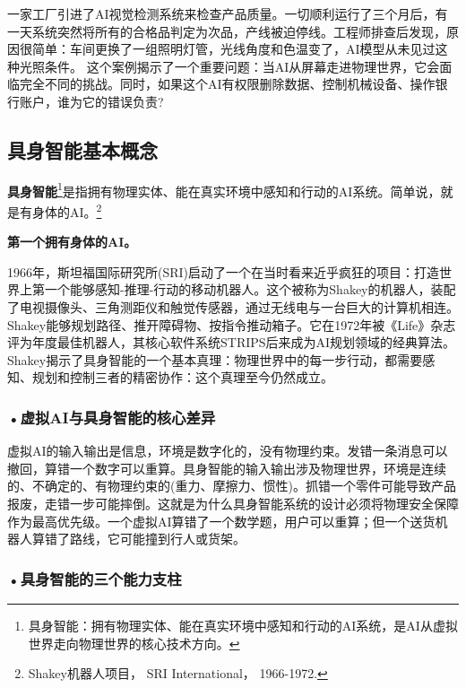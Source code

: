 一家工厂引进了AI视觉检测系统来检查产品质量。一切顺利运行了三个月后，有一天系统突然将所有的合格品判定为次品，产线被迫停线。工程师排查后发现，原因很简单：车间更换了一组照明灯管，光线角度和色温变了，AI模型从未见过这种光照条件。
这个案例揭示了一个重要问题：当AI从屏幕走进物理世界，它会面临完全不同的挑战。同时，如果这个AI有权限删除数据、控制机械设备、操作银行账户，谁为它的错误负责?



\subsection{具身智能基本概念}

\textbf{具身智能}\footnote{具身智能：拥有物理实体、能在真实环境中感知和行动的AI系统，是AI从虚拟世界走向物理世界的核心技术方向。}是指拥有物理实体、能在真实环境中感知和行动的AI系统。简单说，就是有身体的AI。\footnote{Shakey机器人项目， SRI International， 1966-1972.}

\begin{funbox}
\textbf{第一个拥有身体的AI。} 

1966年，斯坦福国际研究所(SRI)启动了一个在当时看来近乎疯狂的项目：打造世界上第一个能够感知-推理-行动的移动机器人。这个被称为Shakey的机器人，装配了电视摄像头、三角测距仪和触觉传感器，通过无线电与一台巨大的计算机相连。Shakey能够规划路径、推开障碍物、按指令推动箱子。它在1972年被《Life》杂志评为年度最佳机器人，其核心软件系统STRIPS后来成为AI规划领域的经典算法。Shakey揭示了具身智能的一个基本真理：物理世界中的每一步行动，都需要感知、规划和控制三者的精密协作：这个真理至今仍然成立。
\end{funbox}


\subsubsection*{\textbf{•虚拟AI与具身智能的核心差异}}


虚拟AI的输入输出是信息，环境是数字化的，没有物理约束。发错一条消息可以撤回，算错一个数字可以重算。具身智能的输入输出涉及物理世界，环境是连续的、不确定的、有物理约束的(重力、摩擦力、惯性)。抓错一个零件可能导致产品报废，走错一步可能摔倒。这就是为什么具身智能系统的设计必须将物理安全保障作为最高优先级。一个虚拟AI算错了一个数学题，用户可以重算；但一个送货机器人算错了路线，它可能撞到行人或货架。


\subsubsection*{\textbf{•具身智能的三个能力支柱}}


